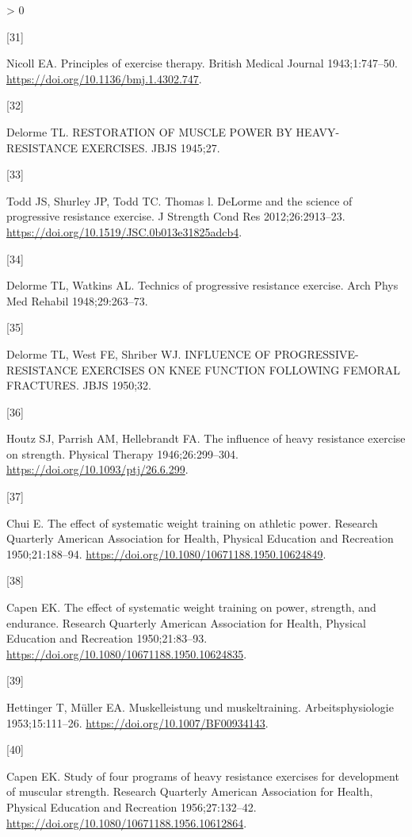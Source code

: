 \documentclass[twoside,10pt]{gihclass} %
\newlength{\cslhangindent}
\newlength{\csllabelwidth}
\newenvironment{CSLReferences}[3] %
 {%
  \setlength{\parindent}{0pt}
  \ifodd #1 \everypar{\setlength{\hangindent}{\cslhangindent}}\ignorespaces\fi
  \ifnum #2 > 0
  \setlength{\parskip}{#2\baselineskip}
  \fi
 }%
 {}
\newcommand{\CSLLeftMargin}[1]{\parbox[t]{\maxof{\widthof{#1}}{\csllabelwidth}}{#1}}
\newcommand{\CSLRightInline}[1]{\parbox[t]{\linewidth}{#1}}
\begin{document}
\begin{CSLReferences}{0}{0}
\leavevmode\hypertarget{ref-RN2634}{}%
\CSLLeftMargin{{[}31{]} }
\CSLRightInline{Nicoll EA. Principles of exercise therapy. British Medical Journal 1943;1:747--50. \url{https://doi.org/10.1136/bmj.1.4302.747}.}

\leavevmode\hypertarget{ref-RN2633}{}%
\CSLLeftMargin{{[}32{]} }
\CSLRightInline{Delorme TL. RESTORATION OF MUSCLE POWER BY HEAVY-RESISTANCE EXERCISES. JBJS 1945;27.}

\leavevmode\hypertarget{ref-RN2639}{}%
\CSLLeftMargin{{[}33{]} }
\CSLRightInline{Todd JS, Shurley JP, Todd TC. Thomas l. DeLorme and the science of progressive resistance exercise. J Strength Cond Res 2012;26:2913--23. \url{https://doi.org/10.1519/JSC.0b013e31825adcb4}.}

\leavevmode\hypertarget{ref-RN2641}{}%
\CSLLeftMargin{{[}34{]} }
\CSLRightInline{Delorme TL, Watkins AL. Technics of progressive resistance exercise. Arch Phys Med Rehabil 1948;29:263--73.}

\leavevmode\hypertarget{ref-RN2646}{}%
\CSLLeftMargin{{[}35{]} }
\CSLRightInline{Delorme TL, West FE, Shriber WJ. INFLUENCE OF PROGRESSIVE-RESISTANCE EXERCISES ON KNEE FUNCTION FOLLOWING FEMORAL FRACTURES. JBJS 1950;32.}

\leavevmode\hypertarget{ref-RN2632}{}%
\CSLLeftMargin{{[}36{]} }
\CSLRightInline{Houtz SJ, Parrish AM, Hellebrandt FA. The influence of heavy resistance exercise on strength. Physical Therapy 1946;26:299--304. \url{https://doi.org/10.1093/ptj/26.6.299}.}

\leavevmode\hypertarget{ref-RN2644}{}%
\CSLLeftMargin{{[}37{]} }
\CSLRightInline{Chui E. The effect of systematic weight training on athletic power. Research Quarterly American Association for Health, Physical Education and Recreation 1950;21:188--94. \url{https://doi.org/10.1080/10671188.1950.10624849}.}

\leavevmode\hypertarget{ref-RN2642}{}%
\CSLLeftMargin{{[}38{]} }
\CSLRightInline{Capen EK. The effect of systematic weight training on power, strength, and endurance. Research Quarterly American Association for Health, Physical Education and Recreation 1950;21:83--93. \url{https://doi.org/10.1080/10671188.1950.10624835}.}

\leavevmode\hypertarget{ref-RN2645}{}%
\CSLLeftMargin{{[}39{]} }
\CSLRightInline{Hettinger T, Müller EA. Muskelleistung und muskeltraining. Arbeitsphysiologie 1953;15:111--26. \url{https://doi.org/10.1007/BF00934143}.}

\leavevmode\hypertarget{ref-RN1477}{}%
\CSLLeftMargin{{[}40{]} }
\CSLRightInline{Capen EK. Study of four programs of heavy resistance exercises for development of muscular strength. Research Quarterly American Association for Health, Physical Education and Recreation 1956;27:132--42. \url{https://doi.org/10.1080/10671188.1956.10612864}.}


\end{CSLReferences}
\end{document}
